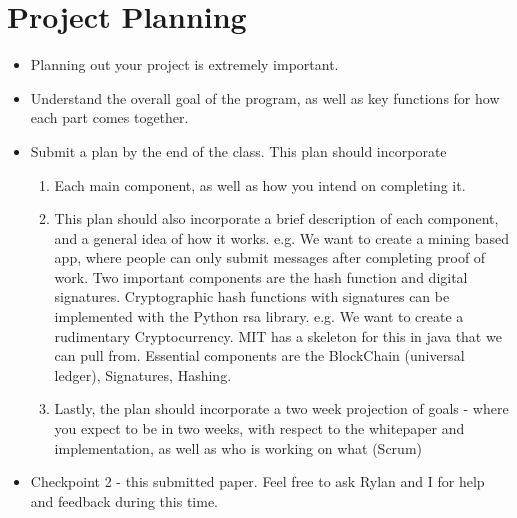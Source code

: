 \documentclass{article}
\begin{document}
\section*{Project Planning}
\begin{itemize}
  \item Planning out your project is extremely important. 
  \item Understand the overall goal of the program, as well as key functions for how 
    each part comes together.
  \item Submit a plan by the end of the class. This plan should incorporate 
    \begin{enumerate}
      \item Each main component, as well as how you intend on completing it. 
      \item This plan should also incorporate a brief description of each component, and a general idea of how it works. 
        \subitem e.g. We want to create a mining based app, where people can only submit messages after completing proof of work. Two important components
        are the hash function and digital signatures. Cryptographic hash functions with signatures can be implemented with the Python rsa library.
        \subitem e.g. We want to create a rudimentary Cryptocurrency. MIT has a skeleton for this in java that we can pull from. Essential components are the BlockChain (universal ledger), 
      Signatures, Hashing.
      \item Lastly, the plan should incorporate a two week projection of goals - where you expect to be in two weeks, with respect to the whitepaper and implementation, as well as
        who is working on what (Scrum)
    \end{enumerate}
    \item Checkpoint 2 - this submitted paper. 
      \subitem Feel free to ask Rylan and I for help and feedback during this time. 
\end{itemize}
\end{document}
